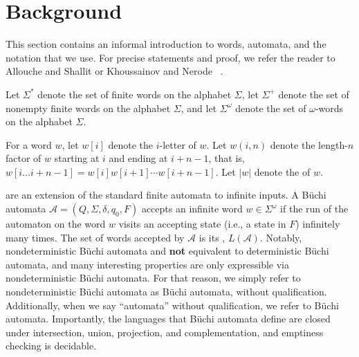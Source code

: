 \section{Background}\label{sec:background}

This section contains an informal introduction to words, automata, and the notation that we use.
For precise statements and proof, we refer the reader to Allouche and Shallit \cite{MR1997038} or Khoussainov and Nerode ~\cite{aut_theory}.

Let $\Sigma^*$ denote the set of finite words on the alphabet $\Sigma$, let $\Sigma^+$ denote the set of nonempty finite words on the alphabet $\Sigma$, and let $\Sigma^\omega$ denote the set of $\omega$-words on the alphabet $\Sigma$.

For a word $w$, let $w[i]$ denote the $i$-letter of $w$.
Let $w(i,n)$ denote the length-$n$ factor of $w$ starting at $i$ and ending at $i + n - 1$, that is, $w[i \ldots i + n - 1] = w[i] w[i + 1] \cdots w[i + n - 1]$.
Let $|w|$ denote the  of $w$.

 are an extension of the standard finite automata to infinite inputs.
A B\"uchi automata $\mathcal{A} = (Q, \Sigma, \delta, q_0, F)$ accepts an infinite word $w \in \Sigma^\omega$ if the run of the automaton on the word $w$ visits an accepting state (i.e., a state in $F$) infinitely many times.
The set of words accepted by $\mathcal{A}$ is its , $L(\mathcal{A})$.
Notably, nondeterministic B\"uchi automata and \textbf{not} equivalent to deterministic B\"uchi automata, and many interesting properties are only expressible via nondeterministic B\"uchi automata.
For that reason, we simply refer to nondeterministic B\"uchi automata as B\"uchi automata, without qualification.
Additionally, when we say ``automata'' without qualification, we refer to B\"uchi automata.
Importantly, the languages that B\"uchi automata define are closed under intersection, union, projection, and complementation, and emptiness checking is decidable.


